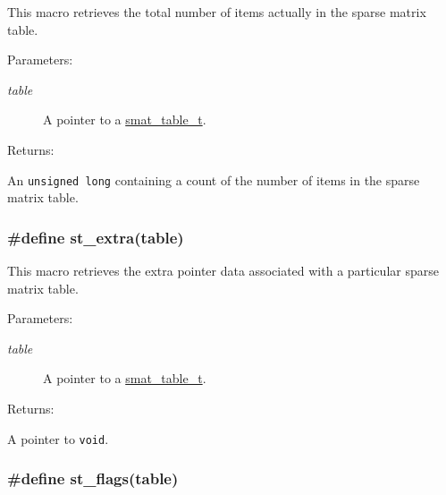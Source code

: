 This macro retrieves the total number of items actually in the sparse matrix table.\begin{Desc}
\item[Parameters: ]\par
\begin{description}
\item[{\em 
table}]A pointer to a \hyperlink{group__dbprim__smat_a0}{smat\_\-table\_\-t}.\end{description}
\end{Desc}
\begin{Desc}
\item[Returns: ]\par
An {\tt unsigned long} containing a count of the number of items in the sparse matrix table. \end{Desc}
\hypertarget{group__dbprim__smat_a27}{
\subsubsection[st\_\-extra]{\setlength{\rightskip}{0pt plus 5cm}\#define st\_\-extra(table)}}
\label{group__dbprim__smat_a27}


This macro retrieves the extra pointer data associated with a particular sparse matrix table.\begin{Desc}
\item[Parameters: ]\par
\begin{description}
\item[{\em 
table}]A pointer to a \hyperlink{group__dbprim__smat_a0}{smat\_\-table\_\-t}.\end{description}
\end{Desc}
\begin{Desc}
\item[Returns: ]\par
A pointer to {\tt void}. \end{Desc}
\hypertarget{group__dbprim__smat_a23}{
\subsubsection[st\_\-flags]{\setlength{\rightskip}{0pt plus 5cm}\#define st\_\-flags(table)}}
\label{group__dbprim__smat_a23}


